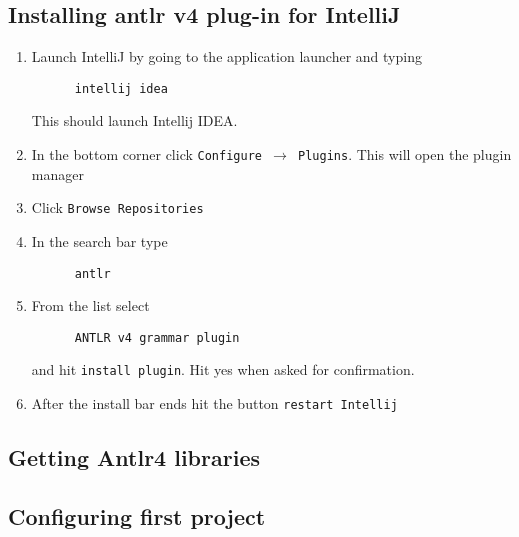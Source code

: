 \documentclass[../setup.tex]{subfiles}
\begin{document}
\subsection{Installing antlr v4 plug-in for IntelliJ}

  \begin{enumerate}
    \item Launch IntelliJ by going to the application launcher and typing
    \begin{lstlisting}
      intellij idea
    \end{lstlisting}
    This should launch Intellij IDEA.

    \item In the bottom corner click \texttt{Configure $\rightarrow$ Plugins}. This will open the plugin manager
    \item Click \texttt{Browse Repositories}
    \item In the search bar type
    \begin{lstlisting}
      antlr
    \end{lstlisting}
    \item From the list select
    \begin{lstlisting}
      ANTLR v4 grammar plugin
    \end{lstlisting}
    and hit \texttt{install plugin}. Hit yes when asked for confirmation.
    \item After the install bar ends hit the button \texttt{restart Intellij}
  \end{enumerate}


\subsection{Getting Antlr4 libraries}



\subsection{Configuring first project}
\end{document}
